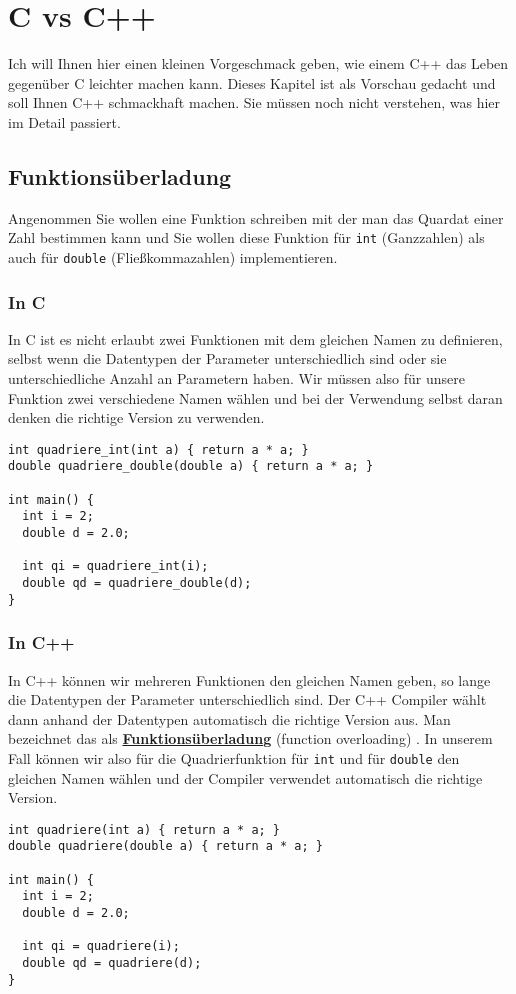\documentclass[11pt]{article}
\begin{document}
\section{C vs C++}
\label{sec-2}
Ich will Ihnen hier einen kleinen Vorgeschmack geben, wie einem C++
das Leben gegenüber C leichter machen kann. Dieses Kapitel ist als
Vorschau gedacht und soll Ihnen C++ schmackhaft machen. Sie müssen
noch nicht verstehen, was hier im Detail passiert.
\subsection{Funktionsüberladung}
\label{sec-2-1}
Angenommen Sie wollen eine Funktion schreiben mit der man das Quardat
einer Zahl bestimmen kann und Sie wollen diese Funktion für \verb~int~
(Ganzzahlen) als auch für \verb~double~ (Fließkommazahlen) implementieren.
\subsubsection{In C}
\label{sec-2-1-1}
In C ist es nicht erlaubt zwei Funktionen mit dem gleichen Namen zu
definieren, selbst wenn die Datentypen der Parameter unterschiedlich
sind oder sie unterschiedliche Anzahl an Parametern haben. Wir müssen
also für unsere Funktion zwei verschiedene Namen wählen und bei der
Verwendung selbst daran denken die richtige Version zu verwenden.
\begin{verbatim}
int quadriere_int(int a) { return a * a; }
double quadriere_double(double a) { return a * a; }

int main() {
  int i = 2;
  double d = 2.0;

  int qi = quadriere_int(i);
  double qd = quadriere_double(d);
}
\end{verbatim}
\subsubsection{In C++}
\label{sec-2-1-2}
In C++ können wir mehreren Funktionen den gleichen Namen geben, so
lange die Datentypen der Parameter unterschiedlich sind. Der C++
Compiler wählt dann anhand der Datentypen automatisch die richtige
Version aus. Man bezeichnet das als \textbf{\href{https://msdn.microsoft.com/de-de/library/5dhe1hce.aspx}{Funktionsüberladung}} (function
overloading) . In unserem Fall können wir also für die Quadrierfunktion
für \verb~int~ und für \verb~double~ den gleichen Namen wählen und der Compiler
verwendet automatisch die richtige Version.
\begin{verbatim}
int quadriere(int a) { return a * a; }
double quadriere(double a) { return a * a; }

int main() {
  int i = 2;
  double d = 2.0;

  int qi = quadriere(i);
  double qd = quadriere(d);
}
\end{verbatim}
\end{document}
